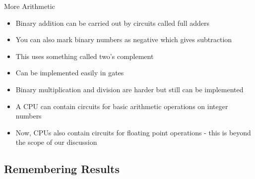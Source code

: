 \documentclass{beamer}
\begin{document}
\begin{frame}{More Arithmetic}
  \begin{itemize}
  \item
    Binary addition can be carried out by circuits called full adders
  \item
    You can also mark binary numbers as negative which gives subtraction
  \item
    This uses something called two's complement
  \item
    Can be implemented easily in gates
  \item
    Binary multiplication and division are harder but still can be implemented
  \item
    A CPU can contain circuits for basic arithmetic operations on integer numbers
  \item
    Now, CPUs also contain circuits for floating point operations - this is beyond the scope of our discussion
  \end{itemize}
\end{frame}


\subsection[memory]{Remembering Results}
\end{document}
